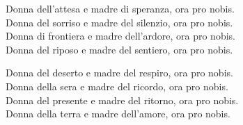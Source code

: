 

\spazio

\strofa Donna dell'attesa e madre di speranza, ora pro nobis.\\
Donna del sorriso e madre del silenzio, ora pro nobis.\\
Donna di frontiera e madre dell'ardore, ora pro nobis.\\
Donna del riposo e madre del sentiero, ora pro nobis.

\spazio


\spazio

\strofa Donna del deserto e madre del respiro, ora pro nobis.\\
Donna della sera e madre del ricordo, ora pro nobis.\\
Donna del presente e madre del ritorno, ora pro nobis.\\
Donna della terra e madre dell'amore, ora pro nobis.

\spazio

